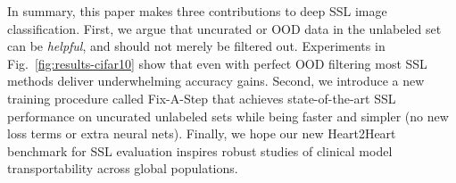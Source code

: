 In summary, this paper makes three contributions to deep SSL image classification.
First, we argue that uncurated or OOD data in the unlabeled set can be \emph{helpful}, and should not merely be filtered out.
Experiments in Fig.~\ref{fig:results-cifar10} show that even with perfect OOD filtering most SSL methods deliver underwhelming accuracy gains.
Second, we introduce a new training procedure called Fix-A-Step that achieves state-of-the-art SSL performance on uncurated unlabeled sets while being faster and simpler (no new loss terms or extra neural nets).
Finally, we hope our new Heart2Heart benchmark for SSL evaluation inspires robust studies of clinical model transportability across global populations.

